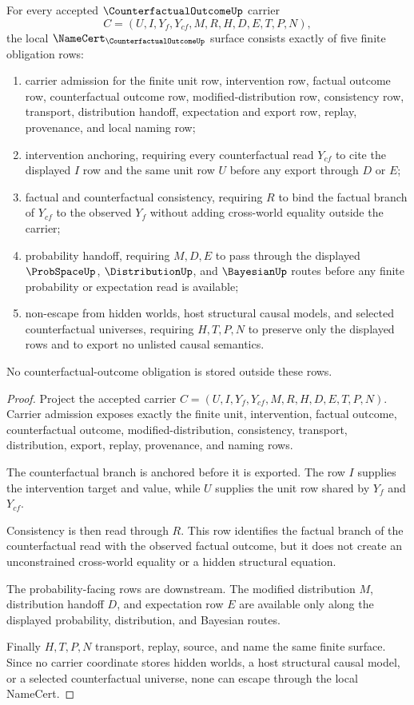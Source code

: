 \begin{theorem}
\label{thm:counterfactual-outcome-namecert-obligations}
For every accepted $\CounterfactualOutcomeUp$ carrier
$$
C=(U,I,Y_f,Y_{cf},M,R,H,D,E,T,P,N),
$$
the local $\NameCert_{\CounterfactualOutcomeUp}$ surface consists exactly of five finite obligation rows:
\begin{enumerate}
\item carrier admission for the finite unit row, intervention row, factual outcome row, counterfactual outcome row, modified-distribution row, consistency row, transport, distribution handoff, expectation and export row, replay, provenance, and local naming row;
\item intervention anchoring, requiring every counterfactual read $Y_{cf}$ to cite the displayed $I$ row and the same unit row $U$ before any export through $D$ or $E$;
\item factual and counterfactual consistency, requiring $R$ to bind the factual branch of $Y_{cf}$ to the observed $Y_f$ without adding cross-world equality outside the carrier;
\item probability handoff, requiring $M,D,E$ to pass through the displayed $\ProbSpaceUp$, $\DistributionUp$, and $\BayesianUp$ routes before any finite probability or expectation read is available;
\item non-escape from hidden worlds, host structural causal models, and selected counterfactual universes, requiring $H,T,P,N$ to preserve only the displayed rows and to export no unlisted causal semantics.
\end{enumerate}
No counterfactual-outcome obligation is stored outside these rows.
\end{theorem}

\begin{proof}
Project the accepted carrier $C=(U,I,Y_f,Y_{cf},M,R,H,D,E,T,P,N)$. Carrier admission exposes exactly the finite unit, intervention, factual outcome, counterfactual outcome, modified-distribution, consistency, transport, distribution, export, replay, provenance, and naming rows.

The counterfactual branch is anchored before it is exported. The row $I$ supplies the intervention target and value, while $U$ supplies the unit row shared by $Y_f$ and $Y_{cf}$.

Consistency is then read through $R$. This row identifies the factual branch of the counterfactual read with the observed factual outcome, but it does not create an unconstrained cross-world equality or a hidden structural equation.

The probability-facing rows are downstream. The modified distribution $M$, distribution handoff $D$, and expectation row $E$ are available only along the displayed probability, distribution, and Bayesian routes.

Finally $H,T,P,N$ transport, replay, source, and name the same finite surface. Since no carrier coordinate stores hidden worlds, a host structural causal model, or a selected counterfactual universe, none can escape through the local NameCert.
\end{proof}

